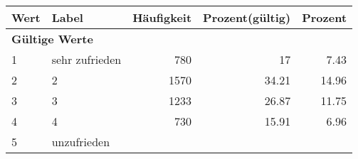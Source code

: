      \begin{longtable}{lXrrr}
     \toprule
     \textbf{Wert} & \textbf{Label} & \textbf{Häufigkeit} & \textbf{Prozent(gültig)} & \textbf{Prozent} \\
     \endhead
     \midrule
     \multicolumn{5}{l}{\textbf{Gültige Werte}}\\

     1 &
     \multicolumn{1}{X}{ sehr zufrieden   } &


       \num{780} &
       \num[round-mode=places,round-precision=2]{17} &
         \num[round-mode=places,round-precision=2]{7,43} \\

     2 &
     \multicolumn{1}{X}{ 2   } &


       \num{1570} &
       \num[round-mode=places,round-precision=2]{34,21} &
         \num[round-mode=places,round-precision=2]{14,96} \\

     3 &
     \multicolumn{1}{X}{ 3   } &


       \num{1233} &
       \num[round-mode=places,round-precision=2]{26,87} &
         \num[round-mode=places,round-precision=2]{11,75} \\

     4 &
     \multicolumn{1}{X}{ 4   } &


       \num{730} &
       \num[round-mode=places,round-precision=2]{15,91} &
         \num[round-mode=places,round-precision=2]{6,96} \\

     5 &
     \multicolumn{1}{X}{ unzufrieden   } &



\end{longtable}
